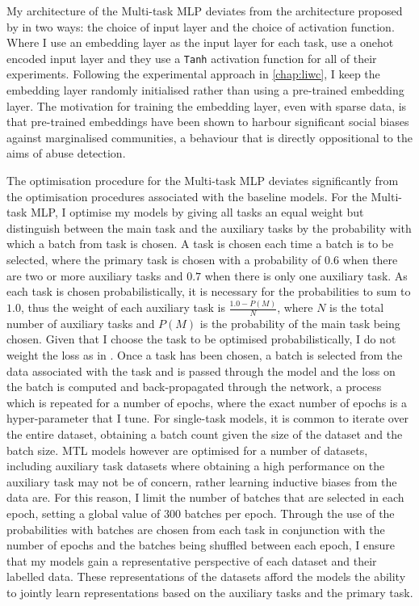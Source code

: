My architecture of the Multi-task MLP deviates from the architecture proposed by \citet{Waseem:2018} in two ways: the choice of input layer and the choice of activation function.
Where I use an embedding layer as the input layer for each task, \citet{Waseem:2018} use a onehot encoded input layer and they use a \texttt{Tanh} activation function for all of their experiments.
Following the experimental approach in \cref{chap:liwc}, I keep the embedding layer randomly initialised rather than using a pre-trained embedding layer.
The motivation for training the embedding layer, even with sparse data, is that pre-trained embeddings have been shown to harbour significant social biases against marginalised communities, a behaviour that is directly oppositional to the aims of abuse detection.

The optimisation procedure for the Multi-task MLP deviates significantly from the optimisation procedures associated with the baseline models.
For the Multi-task MLP, I optimise my models by giving all tasks an equal weight but distinguish between the main task and the auxiliary tasks by the probability with which a batch from task is chosen.
A task is chosen each time a batch is to be selected, where the primary task is chosen with a probability of $0.6$ when there are two or more auxiliary tasks and $0.7$ when there is only one auxiliary task.
As each task is chosen probabilistically, it is necessary for the probabilities to sum to $1.0$, thus the weight of each auxiliary task is $\frac{1.0-P(M)}{N}$, where $N$ is the total number of auxiliary tasks and $P(M)$ is the probability of the main task being chosen.
Given that I choose the task to be optimised probabilistically, I do not weight the loss as in \citet{Rajamanickam:2020}.
Once a task has been chosen, a batch is selected from the data associated with the task and is passed through the model and the loss on the batch is computed and back-propagated through the network, a process which is repeated for a number of epochs, where the exact number of epochs is a hyper-parameter that I tune.
For single-task models, it is common to iterate over the entire dataset, obtaining a batch count given the size of the dataset and the batch size.
MTL models however are optimised for a number of datasets, including auxiliary task datasets where obtaining a high performance on the auxiliary task may not be of concern, rather learning inductive biases from the data are.
For this reason, I limit the number of batches that are selected in each epoch, setting a global value of $300$ batches per epoch.
Through the use of the probabilities with batches are chosen from each task in conjunction with the number of epochs and the batches being shuffled between each epoch, I ensure that my models gain a representative perspective of each dataset and their labelled data.
These representations of the datasets afford the models the ability to jointly learn representations based on the auxiliary tasks and the primary task.

